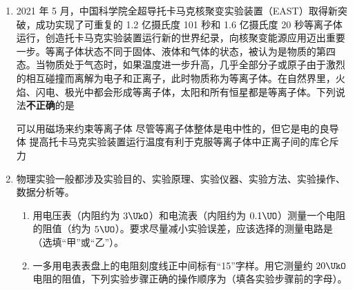 \documentclass[\gkver]{gaokaozhenti}
\begin{document}
\begin{enumerate}
{故 C 正确，D 错误。

故选 C。
}

\item
2021 年 5 月，中国科学院全超导托卡马克核聚变实验装置（EAST）取得新突破，成功实现了可重复的 1.2 亿摄氏度 101 秒和 1.6 亿摄氏度 20 秒等离子体运行，创造托卡马克实验装置运行新的世界纪录，向核聚变能源应用迈出重要一步。等离子体状态不同于固体、液体和气体的状态，被认为是物质的第四态。当物质处于气态时，如果温度进一步升高，几乎全部分子或原子由于激烈的相互碰撞而离解为电子和正离子，此时物质称为等离子体。在自然界里，火焰、闪电、极光中都会形成等离子体，太阳和所有恒星都是等离子体。下列说法\textbf{不正确}的是

{可以用磁场来约束等离子体}
{尽管等离子体整体是电中性的，但它是电的良导体}
{提高托卡马克实验装置运行温度有利于克服等离子体中正离子间的库仑斥力}


\item
物理实验一般都涉及实验目的、实验原理、实验仪器、实验方法、实验操作、数据分析等。
\begin{enumerate}
	\item
	用电压表（内阻约为 $3\UkO$）和电流表（内阻约为 $0.1\UO$）测量一个电阻的阻值（约为 $5\UO$）。要求尽量减小实验误差，应该选择的测量电路是（选填“甲”或“乙”）。

	\item
	一多用电表表盘上的电阻刻度线正中间标有“15”字样。用它测量约 $20\UkO$ 电阻的阻值，下列实验步骤正确的操作顺序为（填各实验步骤前的字母）。


\end{enumerate}
\end{enumerate}
\end{document}
